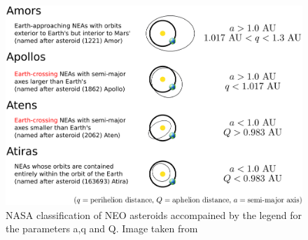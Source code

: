 \documentclass[12pt,%
               a4paper,%
               oneside,openany,%
               titlepage,%
               headinclude,footinclude,%
               BCOR5mm,%
               cleardoublepage=empty,%
               tablecaptionabove,%
               floatperchapter,
               ]{scrreprt}                 %
\begin{document}
\begin{figure}[h]
\begin{center}
\includegraphics[width=1\textwidth]{Figures/neo_orbit_types.jpg}
\caption{NASA classification of NEO asteroids accompained by the legend for the parameters a,q and Q. Image taken from \cite{nasa_classification}}
\label{neo_orbit_types}
\end{center}
\end{figure}






\newpage



\end{document}

